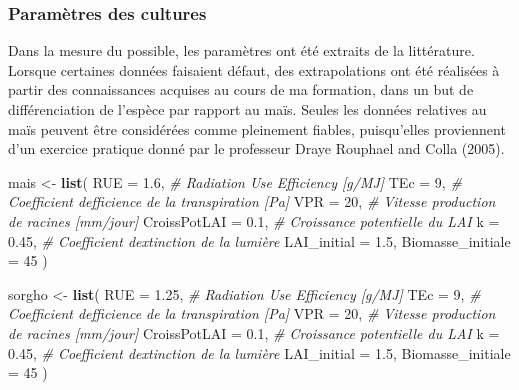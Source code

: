 \documentclass[
]{article}
\newenvironment{Shaded}{\begin{snugshade}}{\end{snugshade}}
\newcommand{\AttributeTok}[1]{\textcolor[rgb]{0.13,0.29,0.53}{#1}}
\newcommand{\CommentTok}[1]{\textcolor[rgb]{0.56,0.35,0.01}{\textit{#1}}}
\newcommand{\DecValTok}[1]{\textcolor[rgb]{0.00,0.00,0.81}{#1}}
\newcommand{\FloatTok}[1]{\textcolor[rgb]{0.00,0.00,0.81}{#1}}
\newcommand{\FunctionTok}[1]{\textcolor[rgb]{0.13,0.29,0.53}{\textbf{#1}}}
\newcommand{\NormalTok}[1]{#1}
\newcommand{\OtherTok}[1]{\textcolor[rgb]{0.56,0.35,0.01}{#1}}
\begin{document}
\subsubsection{Paramètres des
cultures}\label{paramuxe8tres-des-cultures}

Dans la mesure du possible, les paramètres ont été extraits de la
littérature. Lorsque certaines données faisaient défaut, des
extrapolations ont été réalisées à partir des connaissances acquises au
cours de ma formation, dans un but de différenciation de l'espèce par
rapport au maïs. Seules les données relatives au maïs peuvent être
considérées comme pleinement fiables, puisqu'elles proviennent d'un
exercice pratique donné par le professeur Draye Rouphael and Colla
(2005).

\begin{Shaded}
\begin{Highlighting}[]
\NormalTok{mais }\OtherTok{\textless{}{-}} \FunctionTok{list}\NormalTok{(}
  \AttributeTok{RUE               =} \FloatTok{1.6}\NormalTok{,   }\CommentTok{\# Radiation Use Efficiency [g/MJ]}
  \AttributeTok{TEc               =} \DecValTok{9}\NormalTok{,     }\CommentTok{\# Coefficient d\textquotesingle{}efficience de la transpiration [Pa]}
  \AttributeTok{VPR               =} \DecValTok{20}\NormalTok{,    }\CommentTok{\# Vitesse production de racines [mm/jour]}
  \AttributeTok{CroissPotLAI      =} \FloatTok{0.1}\NormalTok{,   }\CommentTok{\# Croissance potentielle du LAI }
  \AttributeTok{k                 =} \FloatTok{0.45}\NormalTok{,  }\CommentTok{\# Coefficient d\textquotesingle{}extinction de la lumière}
  \AttributeTok{LAI\_initial       =} \FloatTok{1.5}\NormalTok{,   }
  \AttributeTok{Biomasse\_initiale =} \DecValTok{45}     
\NormalTok{)}

\NormalTok{sorgho }\OtherTok{\textless{}{-}} \FunctionTok{list}\NormalTok{(}
  \AttributeTok{RUE               =} \FloatTok{1.25}\NormalTok{,  }\CommentTok{\# Radiation Use Efficiency [g/MJ]}
  \AttributeTok{TEc               =} \DecValTok{9}\NormalTok{,     }\CommentTok{\# Coefficient d\textquotesingle{}efficience de la transpiration [Pa]}
  \AttributeTok{VPR               =} \DecValTok{20}\NormalTok{,    }\CommentTok{\# Vitesse production de racines [mm/jour]}
  \AttributeTok{CroissPotLAI      =} \FloatTok{0.1}\NormalTok{,   }\CommentTok{\# Croissance potentielle du LAI }
  \AttributeTok{k                 =} \FloatTok{0.45}\NormalTok{,  }\CommentTok{\# Coefficient d\textquotesingle{}extinction de la lumière}
  \AttributeTok{LAI\_initial       =} \FloatTok{1.5}\NormalTok{,   }
  \AttributeTok{Biomasse\_initiale =} \DecValTok{45}     
\NormalTok{)}


\end{Highlighting}
\end{Shaded}
\end{document}
